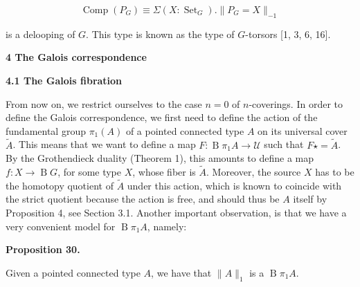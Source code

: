 \documentclass[10pt,a4paper]{article}
\begin{document}
\par  \quad  \[\operatorname{Comp}(P_{G})\equiv\Sigma(X:\operatorname{Set}_{G}).\|P_{G}=X\|_{-1}\]\quad  \quad  
  
is a delooping of $G$. This type is known as the type of $G$-torsors [1, 3, 6, 16].\par
 
 
 
 
 


 
\par\medskip\noindent\textbf{4 The Galois correspondence}\par
 
 
\par\medskip\noindent\textbf{4.1 The Galois fibration}\par
 
 
From now on, we restrict ourselves to the case $n=0$ of $n$-coverings. In order to define the Galois correspondence, we first need to define the action of the fundamental group $\pi_{1}(A)$ of a pointed connected type $A$ on its universal cover $\tilde{A}$. This means that we want to define a map $F:\operatorname{B}\pi_{1}A\to\mathcal{U}$ such that $F\star=\tilde{A}$. By the Grothendieck duality (Theorem 1), this amounts to define a map $f:X\to\operatorname{B}G$, for some type $X$, whose fiber is $\tilde{A}$. Moreover, the source $X$ has to be the homotopy quotient of $\tilde{A}$ under this action, which is known to coincide with the strict quotient because the action is free, and should thus be $A$ itself by Proposition 4, see Section 3.1. Another important observation, is that we have a very convenient model for $\operatorname{B}\pi_{1}A$, namely:\par
 
 
 
\par\medskip\noindent\textbf{Proposition 30.}\par
 
 
Given a pointed connected type $A$, we have that $\|A\|_{1}$ is a $\operatorname{B}\pi_{1}A$.\par
 
\end{document}
